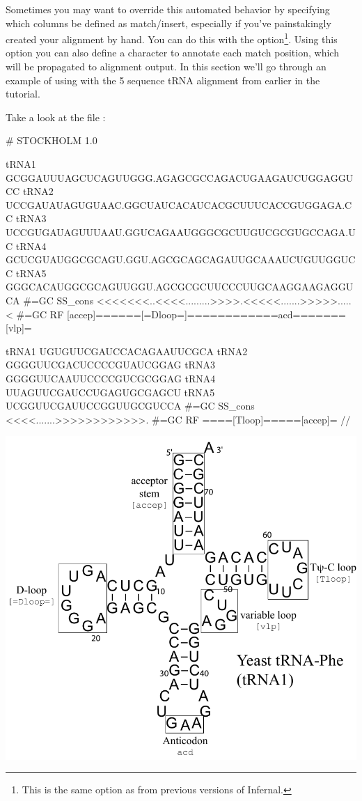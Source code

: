 Sometimes you may want to override this automated behavior by
specifying which columns be defined as match/insert, especially if
you've painstakingly created your alignment by hand. You can do this
with the  option\footnote{This is the same option as
   from previous versions of Infernal.}. Using this option
you can also define a character to annotate each match position, which
will be propagated to alignment output. In this section we'll go
through an example of using  with the 5 sequence tRNA
alignment from earlier in the tutorial.

Take a look at the file :

\vspace{1em}
\begin{minipage}{4.0in}
\begin{sreoutput}[xleftmargin=0em]
# STOCKHOLM 1.0

tRNA1             GCGGAUUUAGCUCAGUUGGG.AGAGCGCCAGACUGAAGAUCUGGAGGUCC
tRNA2             UCCGAUAUAGUGUAAC.GGCUAUCACAUCACGCUUUCACCGUGGAGA.CC
tRNA3             UCCGUGAUAGUUUAAU.GGUCAGAAUGGGCGCUUGUCGCGUGCCAGA.UC
tRNA4             GCUCGUAUGGCGCAGU.GGU.AGCGCAGCAGAUUGCAAAUCUGUUGGUCC
tRNA5             GGGCACAUGGCGCAGUUGGU.AGCGCGCUUCCCUUGCAAGGAAGAGGUCA
#=GC SS_cons      <<<<<<<..<<<<.........>>>>.<<<<<.......>>>>>.....<
#=GC RF           [accep]======[=Dloop=]============acd=======[vlp]=

tRNA1             UGUGUUCGAUCCACAGAAUUCGCA
tRNA2             GGGGUUCGACUCCCCGUAUCGGAG
tRNA3             GGGGUUCAAUUCCCCGUCGCGGAG
tRNA4             UUAGUUCGAUCCUGAGUGCGAGCU
tRNA5             UCGGUUCGAUUCCGGUUGCGUCCA
#=GC SS_cons      <<<<.......>>>>>>>>>>>>.
#=GC RF           ====[Tloop]=====[accep]=
//
\end{sreoutput}
\end{minipage}
\begin{minipage}{1.5in}
\includegraphics[scale=0.4]{Figures/trna1-DF6280-hand}
\end{minipage}
\vspace{1em}

